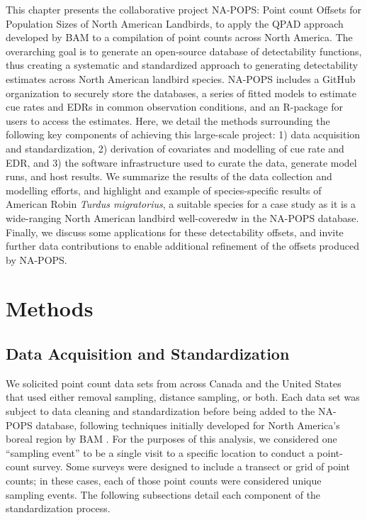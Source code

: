 \par This chapter presents the collaborative project NA-POPS: Point count Offsets for Population Sizes of North American Landbirds, to apply the QPAD approach developed by BAM to a compilation of point counts across North America. The overarching goal is to generate an open-source database of detectability functions, thus creating a systematic and standardized approach to generating detectability estimates across North American landbird species. NA-POPS includes a GitHub organization \citep{blischak_quick_2016, crystal-ornelas_not_2022} to securely store the databases, a series of fitted models to estimate cue rates and EDRs in common observation conditions, and an R-package for users to access the estimates. Here, we detail the methods surrounding the following key components of achieving this large-scale project: 1) data acquisition and standardization, 2) derivation of covariates and modelling of cue rate and EDR, and 3) the software infrastructure used to curate the data, generate model runs, and host results. We summarize the results of the data collection and modelling efforts, and highlight and example of species-specific results of American Robin \textit{Turdus migratorius}, a suitable species for a case study as it is a wide-ranging North American landbird well-coveredw in the NA-POPS database. Finally, we discuss some applications for these detectability offsets, and invite further data contributions to enable additional refinement of the offsets produced by NA-POPS.


\section{Methods}
\subsection{Data Acquisition and Standardization}
\par We solicited point count data sets from across Canada and the United States that used either removal sampling, distance sampling, or both. Each data set was subject to data cleaning and standardization before being added to the NA-POPS database, following techniques initially developed for North America’s boreal region by BAM \citep{cumming_toward_2010, barker_ecological_2015}. For the purposes of this analysis, we considered one “sampling event” to be a single visit to a specific location to conduct a point-count survey. Some surveys were designed to include a transect or grid of point counts; in these cases, each of those point counts were considered unique sampling events. The following subsections detail each component of the standardization process.

